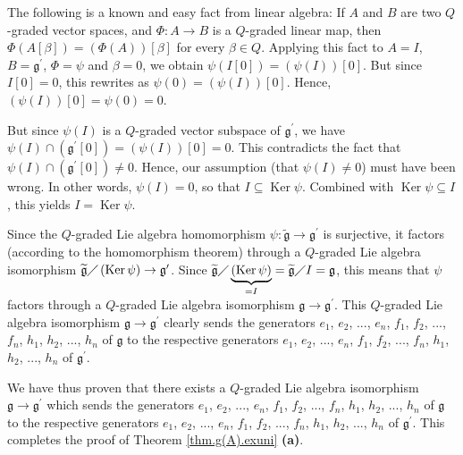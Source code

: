 \documentclass[etingof-lie.tex]{subfiles}
\begin{document}
The following is a known and easy fact from linear algebra: If $A$ and $B$ are
two $Q$-graded vector spaces, and $\Phi:A\rightarrow B$ is a $Q$-graded linear
map, then $\Phi\left(  A\left[  \beta\right]  \right)  =\left(  \Phi\left(
A\right)  \right)  \left[  \beta\right]  $ for every $\beta\in Q$. Applying
this fact to $A=I$, $B=\mathfrak{g}^{\prime}$, $\Phi=\psi$ and $\beta=0$, we
obtain $\psi\left(  I\left[  0\right]  \right)  =\left(  \psi\left(  I\right)
\right)  \left[  0\right]  $. But since $I\left[  0\right]  =0$, this rewrites
as $\psi\left(  0\right)  =\left(  \psi\left(  I\right)  \right)  \left[
0\right]  $. Hence, $\left(  \psi\left(  I\right)  \right)  \left[  0\right]
=\psi\left(  0\right)  =0$.

But since $\psi\left(  I\right)  $ is a $Q$-graded vector subspace of
$\mathfrak{g}^{\prime}$, we have $\psi\left(  I\right)  \cap\left(
\mathfrak{g}^{\prime}\left[  0\right]  \right)  =\left(  \psi\left(  I\right)
\right)  \left[  0\right]  =0$. This contradicts the fact that $\psi\left(
I\right)  \cap\left(  \mathfrak{g}^{\prime}\left[  0\right]  \right)  \neq0$.
Hence, our assumption (that $\psi\left(  I\right)  \neq0$) must have been
wrong. In other words, $\psi\left(  I\right)  =0$, so that $I\subseteq
\operatorname*{Ker}\psi$. Combined with $\operatorname*{Ker}\psi\subseteq I$,
this yields $I=\operatorname*{Ker}\psi$.

Since the $Q$-graded Lie algebra homomorphism $\psi:\widetilde{\mathfrak{g}%
}\rightarrow\mathfrak{g}^{\prime}$ is surjective, it factors (according to the
homomorphism theorem) through a $Q$-graded Lie algebra isomorphism
$\widetilde{\mathfrak{g}}\diagup\left(  \operatorname*{Ker}\psi\right)
\rightarrow\mathfrak{g}^{\prime}$. Since $\widetilde{\mathfrak{g}}%
\diagup\underbrace{\left(  \operatorname*{Ker}\psi\right)  }_{=I}%
=\widetilde{\mathfrak{g}}\diagup I=\mathfrak{g}$, this means that $\psi$
factors through a $Q$-graded Lie algebra isomorphism $\mathfrak{g}%
\rightarrow\mathfrak{g}^{\prime}$. This $Q$-graded Lie algebra isomorphism
$\mathfrak{g}\rightarrow\mathfrak{g}^{\prime}$ clearly sends the generators
$e_{1}$, $e_{2}$, $...$, $e_{n}$, $f_{1}$, $f_{2}$, $...$, $f_{n}$, $h_{1}$,
$h_{2}$, $...$, $h_{n}$ of $\mathfrak{g}$ to the respective generators $e_{1}%
$, $e_{2}$, $...$, $e_{n}$, $f_{1}$, $f_{2}$, $...$, $f_{n}$, $h_{1}$, $h_{2}%
$, $...$, $h_{n}$ of $\mathfrak{g}^{\prime}$.

We have thus proven that there exists a $Q$-graded Lie algebra isomorphism
$\mathfrak{g}\rightarrow\mathfrak{g}^{\prime}$ which sends the generators
$e_{1}$, $e_{2}$, $...$, $e_{n}$, $f_{1}$, $f_{2}$, $...$, $f_{n}$, $h_{1}$,
$h_{2}$, $...$, $h_{n}$ of $\mathfrak{g}$ to the respective generators $e_{1}%
$, $e_{2}$, $...$, $e_{n}$, $f_{1}$, $f_{2}$, $...$, $f_{n}$, $h_{1}$, $h_{2}%
$, $...$, $h_{n}$ of $\mathfrak{g}^{\prime}$. This completes the proof of
Theorem \ref{thm.g(A).exuni} \textbf{(a)}.
\end{document}
